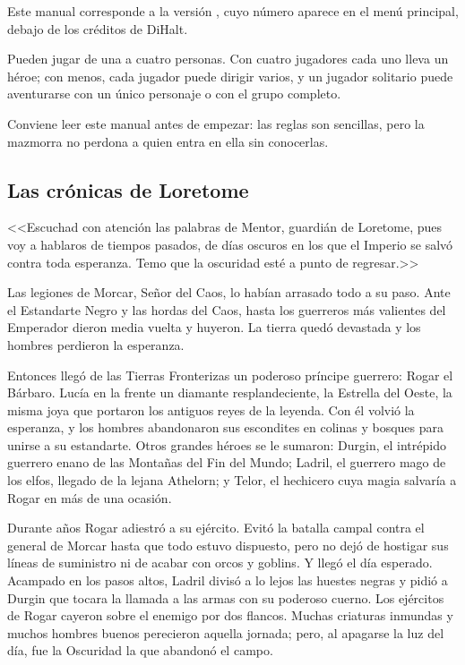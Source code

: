 Este manual corresponde a la versión \versionjuego{}, cuyo número aparece
en el menú principal, debajo de los créditos de DiHalt.

Pueden jugar de una a cuatro personas. Con cuatro jugadores cada uno lleva
un héroe; con menos, cada jugador puede dirigir varios, y un jugador
solitario puede aventurarse con un único personaje o con el grupo completo.

Conviene leer este manual antes de empezar: las reglas son sencillas, pero
la mazmorra no perdona a quien entra en ella sin conocerlas.


\subsection{Las crónicas de Loretome}

<<Escuchad con atención las palabras de Mentor, guardián de Loretome, pues
voy a hablaros de tiempos pasados, de días oscuros en los que el Imperio se
salvó contra toda esperanza. Temo que la oscuridad esté a punto de
regresar.>>

Las legiones de Morcar, Señor del Caos, lo habían arrasado todo a su paso.
Ante el Estandarte Negro y las hordas del Caos, hasta los guerreros más
valientes del Emperador dieron media vuelta y huyeron. La tierra quedó
devastada y los hombres perdieron la esperanza.

Entonces llegó de las Tierras Fronterizas un poderoso príncipe guerrero:
Rogar el Bárbaro. Lucía en la frente un diamante resplandeciente, la
Estrella del Oeste, la misma joya que portaron los antiguos reyes de la
leyenda. Con él volvió la esperanza, y los hombres abandonaron sus
escondites en colinas y bosques para unirse a su estandarte. Otros grandes
héroes se le sumaron: Durgin, el intrépido guerrero enano de las Montañas
del Fin del Mundo; Ladril, el guerrero mago de los elfos, llegado de la
lejana Athelorn; y Telor, el hechicero cuya magia salvaría a Rogar en más de
una ocasión.

Durante años Rogar adiestró a su ejército. Evitó la batalla campal contra
el general de Morcar hasta que todo estuvo dispuesto, pero no dejó de
hostigar sus líneas de suministro ni de acabar con orcos y goblins. Y llegó
el día esperado. Acampado en los pasos altos, Ladril divisó a lo lejos las
huestes negras y pidió a Durgin que tocara la llamada a las armas con su
poderoso cuerno. Los ejércitos de Rogar cayeron sobre el enemigo por dos
flancos. Muchas criaturas inmundas y muchos hombres buenos perecieron
aquella jornada; pero, al apagarse la luz del día, fue la Oscuridad la que
abandonó el campo.

